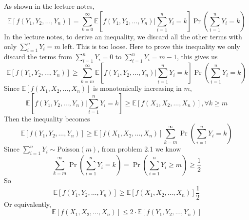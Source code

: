 \documentclass[12pt,letterpaper]{article}
\begin{document}
\subsection{}
As shown in the lecture notes,
$$\mathbb{E}\left[f(Y_1,Y_2,\dots,Y_n)\right]=
\sum_{k=0}^{\infty}\mathbb{E}\left[f(Y_1,Y_2,\dots,Y_n)\bigg|
\sum_{i=1}^{n}Y_i=k\right]
\Pr(\sum_{i=1}^{n}Y_i=k)$$
In the lecture notes, to derive an inequality,
we discard all the other terms with only 
$\sum_{i=1}^{n}Y_i=m$ left.
This is too loose.
Here to prove this inequality we only discard 
the terms from $\sum_{i=1}^{n}Y_i=0$ to $\sum_{i=1}^{n}Y_i=m-1$,
this gives us 
$$\mathbb{E}\left[f(Y_1,Y_2,\dots,Y_n)\right]\geq
\sum_{k=m}^{\infty}\mathbb{E}\left[f(Y_1,Y_2,\dots,Y_n)\bigg|
\sum_{i=1}^{n}Y_i=k\right]
\Pr(\sum_{i=1}^{n}Y_i=k)$$ 
Since $\mathbb{E}\left[f(X_1,X_2,\dots,X_n)\right]$ is monotonically increasing in $m$,
$$\mathbb{E}\left[f(Y_1,Y_2,\dots,Y_n)\bigg|
\sum_{i=1}^{n}Y_i=k\right]\geq \mathbb{E}\left[f(X_1,X_2,\dots,X_n)\right], \forall k\geq m$$
Then the inequality becomes 
$$\mathbb{E}\left[f(Y_1,Y_2,\dots,Y_n)\right]\geq
\mathbb{E}\left[f(X_1,X_2,\dots,X_n)\right]
\sum_{k=m}^{\infty}\Pr(\sum_{i=1}^{n}Y_i=k)$$ 
Since $\sum_{i=1}^{n}Y_i\sim \text{Poisson}(m)$,
from problem 2.1 we know 
$$\sum_{k=m}^{\infty}\Pr(\sum_{i=1}^{n}Y_i=k)
=\Pr(\sum_{i=1}^{n}Y_i\geq m)\geq\frac{1}{2}$$
So $$\mathbb{E}\left[f(Y_1,Y_2,\dots,Y_n)\right]\geq
\mathbb{E}\left[f(X_1,X_2,\dots,X_n)\right]\frac{1}{2}$$
Or equivalently,
$$\mathbb{E}\left[f(X_1,X_2,\dots,X_n)\right]\leq 
2\cdot\mathbb{E}\left[f(Y_1,Y_2,\dots,Y_n)\right]$$ 
\end{document}
